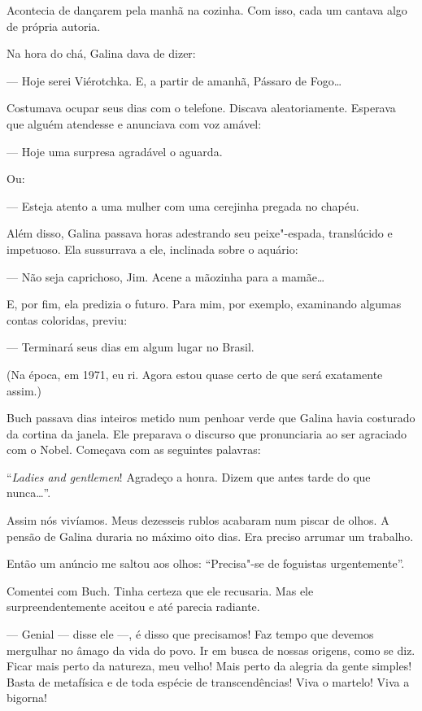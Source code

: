 Acontecia de dançarem pela manhã na cozinha. Com isso, cada um cantava
algo de própria autoria.

Na hora do chá, Galina dava de dizer:

--- Hoje serei Viérotchka. E, a partir de amanhã, Pássaro de Fogo\ldots{}

Costumava ocupar seus dias com o telefone. Discava aleatoriamente.
Esperava que alguém atendesse e anunciava com voz amável:

--- Hoje uma surpresa agradável o aguarda.

Ou:

--- Esteja atento a uma mulher com uma cerejinha pregada no chapéu.

Além disso, Galina passava horas adestrando seu peixe"-espada,
translúcido e impetuoso. Ela sussurrava a ele, inclinada sobre o
aquário:

--- Não seja caprichoso, Jim. Acene a mãozinha para a mamãe\ldots{}

E, por fim, ela predizia o futuro. Para mim, por exemplo, examinando
algumas contas coloridas, previu:

--- Terminará seus dias em algum lugar no Brasil.

(Na época, em 1971, eu ri. Agora estou quase certo de que será
exatamente assim.)

Buch passava dias inteiros metido num penhoar verde que Galina havia
costurado da cortina da janela. Ele preparava o discurso que
pronunciaria ao ser agraciado com o Nobel. Começava com as seguintes
palavras:

``\emph{Ladies and gentlemen}! Agradeço a honra. Dizem que antes tarde
do que nunca\ldots{}''.

Assim nós vivíamos. Meus dezesseis rublos acabaram num piscar de olhos.
A pensão de Galina duraria no máximo oito dias. Era preciso arrumar um
trabalho.

Então um anúncio me saltou aos olhos: ``Precisa"-se de foguistas
urgentemente''.

Comentei com Buch. Tinha certeza que ele recusaria. Mas ele
surpreendentemente aceitou e até parecia radiante.

--- Genial --- disse ele ---, é disso que precisamos! Faz tempo que
devemos mergulhar no âmago da vida do povo. Ir em busca de nossas
origens, como se diz. Ficar mais perto da natureza, meu velho! Mais
perto da alegria da gente simples! Basta de metafísica e de toda espécie
de transcendências! Viva o martelo! Viva a bigorna!

